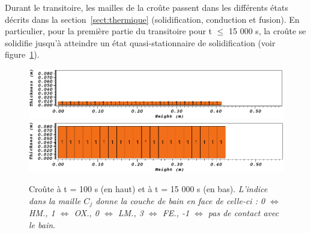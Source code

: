 Durant le transitoire, les mailles de la croûte passent dans les différents états décrits dans la section~\ref{sect:thermique} (solidification, conduction et fusion). En particulier, pour la première partie du transitoire pour t $\leq$ 15 000 s, la croûte se solidifie jusqu'à atteindre un état quasi-stationnaire de solidification (voir figure~\ref{fig:croutes_1}).  
\begin{figure}
\centering
\includegraphics[width=\textwidth, keepaspectratio=true]{Figures/croute_100.png}\\
\includegraphics[width=\textwidth, keepaspectratio=true]{Figures/croute_15000.png}
\caption{Croûte à t = 100 s (en haut) et à t = 15 000 s (en bas). \textit{L'indice dans la maille $C_j$ donne la couche de bain en face de celle-ci : 0 $\Leftrightarrow$ HM., 1 $\Leftrightarrow$ OX., 0 $\Leftrightarrow$ LM., 3 $\Leftrightarrow$ FE., -1 $\Leftrightarrow$ pas de contact avec le bain}.}
\label{fig:croutes_1}
\end{figure}

